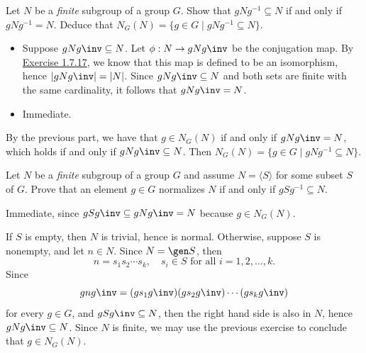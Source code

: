 \begin{exercise}\label{ex3.1.27}
    Let $N$ be a \emph{finite} subgroup of a group $G$. Show that $gNg^{-1} \subseteq N$ if and only if $gNg^{-1} = N$. Deduce that $N_G(N) = \{ g \in G \mid gNg^{-1} \subseteq N \}$.
\end{exercise}

\begin{sol}
    \leavevmode
    \begin{itemize}
        \item[\rightimp] Suppose $gNg\inv \subseteq N$. Let $\phi : N \to gNg\inv$ be the conjugation map. By \hyperref[ex1.7.17]{Exercise 1.7.17}, we know that this map is defined to be an isomorphism, hence $|gNg\inv| = |N|$. Since $gNg\inv \subseteq N$ and both sets are finite with the same cardinality, it follows that $gNg\inv = N$.
        \item[\leftimp] Immediate.
    \end{itemize}

    By the previous part, we have that $g \in N_G(N)$ if and only if $gNg\inv = N$, which holds if and only if $gNg\inv \subseteq N$. Then $N_G(N) = \{ g \in G \mid gNg^{-1} \subseteq N \}$.
\end{sol}

\newpage

\begin{exercise}\label{ex3.1.28}
    Let $N$ be a \emph{finite} subgroup of a group $G$ and assume $N = \langle S \rangle$ for some subset $S$ of $G$. Prove that an element $g \in G$ normalizes $N$ if and only if $gSg^{-1} \subseteq N$.
\end{exercise}

\begin{solitem}
    \item [\rightimp] Immediate, since $gSg\inv \subseteq gNg\inv = N$ because $g \in N_G(N)$.

    \item [\leftimp] If $S$ is empty, then $N$ is trivial, hence is normal. Otherwise, suppose $S$ is nonempty, and let $n \in N$. Since $N = \gen S$, then
    \[n = s_1s_2 \cdots s_k, \quad s_i \in S \text{ for all } i = 1, 2, \ldots, k.\]
    Since
    \[gng\inv = (gs_1g\inv)(gs_2g\inv) \cdots (gs_kg\inv)\]
    for every $g \in G$, and $gSg\inv \subseteq N$, then the right hand side is also in $N$, hence $gNg\inv \subseteq N$. Since $N$ is finite, we may use the previous exercise to conclude that $g \in N_G(N)$.
\end{solitem}

